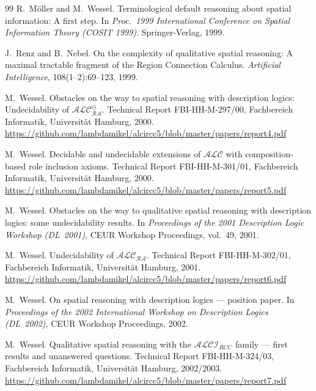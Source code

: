 \documentclass[
]{ceurart}
\theoremstyle{definition}
\newcommand{\ALC}{\ensuremath{\mathcal{ALC}}}
\newcommand{\ALCIRCC}[1]{\ensuremath{\mathcal{ALCI}_{\mathit{RCC#1}}}}
\begin{document}
\begin{thebibliography}{99}
 R.\ M\"oller and M.\ Wessel.  \newblock
  Terminological default reasoning about spatial information: A first
  step.  \newblock In \emph{Proc.\ 1999 International Conference on
  Spatial Information Theory (COSIT 1999)}. Springer-Verlag, 1999.

J.\ Renz and B.\ Nebel.
\newblock On the complexity of qualitative spatial reasoning:
  A maximal tractable fragment of the Region Connection Calculus.
\newblock \emph{Artificial Intelligence}, 108(1--2):69--123, 1999.

M.\ Wessel.
\newblock Obstacles on the way to spatial reasoning with description
  logics: Undecidability of $\ALC_{\mathcal{RA}}^\ominus$.
\newblock Technical Report FBI-HH-M-297/00, Fachbereich Informatik,
  Universit\"at Hamburg, 2000.
\newblock \url{https://github.com/lambdamikel/alcircc5/blob/master/papers/report4.pdf}

M.\ Wessel.
\newblock Decidable and undecidable extensions of $\ALC$ with
  composition-based role inclusion axioms.
\newblock Technical Report FBI-HH-M-301/01, Fachbereich Informatik,
  Universit\"at Hamburg, 2000.
\newblock \url{https://github.com/lambdamikel/alcircc5/blob/master/papers/report5.pdf}

M.\ Wessel.
\newblock Obstacles on the way to qualitative spatial reasoning with
  description logics: some undecidability results.
\newblock In \emph{Proceedings of the 2001 Description Logic Workshop
  (DL~2001)}, CEUR Workshop Proceedings, vol.~49, 2001.

M.\ Wessel.
\newblock Undecidability of $\ALC_{\mathcal{RA}}$.
\newblock Technical Report FBI-HH-M-302/01, Fachbereich Informatik,
  Universit\"at Hamburg, 2001.
\newblock \url{https://github.com/lambdamikel/alcircc5/blob/master/papers/report6.pdf}

M.\ Wessel.
\newblock On spatial reasoning with description logics --- position paper.
\newblock In \emph{Proceedings of the 2002 International Workshop on
  Description Logics (DL~2002)}, CEUR Workshop Proceedings, 2002.

M.\ Wessel.
\newblock Qualitative spatial reasoning with the $\ALCIRCC{}$ family ---
  first results and unanswered questions.
\newblock Technical Report FBI-HH-M-324/03, Fachbereich Informatik,
  Universit\"at Hamburg, 2002/2003.
\newblock \url{https://github.com/lambdamikel/alcircc5/blob/master/papers/report7.pdf}


\end{thebibliography}
\end{document}
